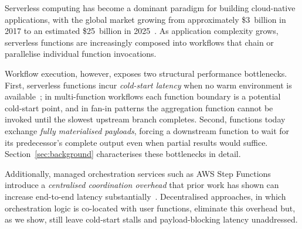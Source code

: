 \documentclass[runningheads]{llncs}
\begin{document}
Serverless computing has become a dominant paradigm for building cloud-native applications, with the global market growing from approximately \$3~billion in 2017 to an estimated \$25~billion in 2025~\cite{wen2022riseplanetserverlesscomputing,PrecedenceResearch2025}. As application complexity grows, serverless functions are increasingly composed into workflows that chain or parallelise individual function invocations.

Workflow execution, however, exposes two structural performance bottlenecks. First, serverless functions incur \emph{cold-start latency} when no warm environment is available~\cite{lin2019mitigatingcoldstartsserverless,shahrad2020serverless}; in multi-function workflows each function boundary is a potential cold-start point, and in fan-in patterns the aggregation function cannot be invoked until the slowest upstream branch completes. Second, functions today exchange \emph{fully materialised payloads}, forcing a downstream function to wait for its predecessor's complete output even when partial results would suffice. Section~\ref{sec:background} characterises these bottlenecks in detail.

Additionally, managed orchestration services such as AWS Step Functions introduce a \emph{centralised coordination overhead} that prior work has shown can increase end-to-end latency substantially~\cite{285171,285113}. Decentralised approaches, in which orchestration logic is co-located with user functions, eliminate this overhead but, as we show, still leave cold-start stalls and payload-blocking latency unaddressed.
\end{document}
